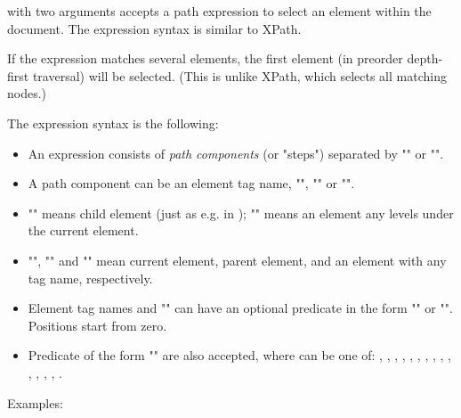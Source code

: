  with two arguments accepts a path expression
to select an element within the document. The expression syntax is
similar to XPath.

If the expression matches several elements, the first element
(in preorder depth-first traversal) will be selected. (This is
unlike XPath, which selects all matching nodes.)

The expression syntax is the following:

\begin{itemize}
  \item An expression consists of \textit{path components} (or "steps")
        separated by "\ttt{/}" or "\ttt{//}".
  \item A path component can be an element tag name, "\ttt{*}", ""
        or "".
  \item "\ttt{/}" means child element (just as e.g. in );
        "\ttt{//}" means an element any levels under the current element.
  \item "", "" and "\ttt{*}" mean current element,
        parent element, and an element with any tag name, respectively.
  \item Element tag names and "\ttt{*}" can have an optional predicate
        in the form "\ttt{[position]}" or "\ttt{[@attribute='value']}".
        Positions start from zero.
  \item Predicate of the form "\ttt{[@attribute=\textit{\$param}]}" are also
        accepted, where  can be one of:
        , , ,
        , ,
        , ,
        , , ,
        , ,
        , ,
        .
\end{itemize}

Examples:

